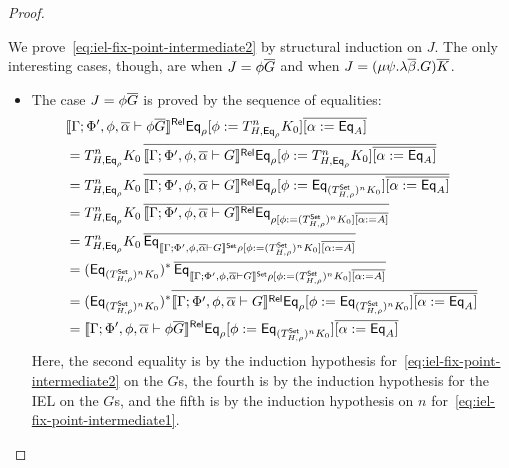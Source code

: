 \documentclass[acmsmall,review,anonymous]{acmart}
\theoremstyle{definition}
\newcommand{\set}{\mathsf{Set}}
\begin{document}
\begin{proof}
\begin{itemize}
We prove~\eqref{eq:iel-fix-point-intermediate2} by structural
induction on $J$. The only interesting cases, though, are when
$J = \phi \overline{G}$ and when $J = (\mu \psi.\lambda \overline{\beta}. G)\overline{K}$.
\begin{itemize}
\item The case $J = \phi \overline{G}$ is proved by the sequence of equalities:
\[
\begin{split}
& \relsem{\Gamma; \Phi', \phi, \ol{\alpha} \vdash \phi
    \ol{G}} \Eq_{\rho} [\phi := T^{n}_{H,\Eq_{\rho}} K_0]
  \overline{[\alpha := \Eq_A]}
  \\
&= T^{n}_{H,\Eq_{\rho}} K_0\, \overline{\relsem{\Gamma; \Phi',
      \phi, \ol{\alpha} \vdash G} \Eq_{\rho} [\phi :=
      T^{n}_{H,\Eq_{\rho}} K_0] \overline{[\alpha :=
        \Eq_A]}} \\ 
&= T^{n}_{H,\Eq_{\rho}} K_0\, \overline{\relsem{\Gamma; \Phi',
      \phi, \ol{\alpha} \vdash G} \Eq_{\rho} [\phi :=
      \Eq_{(T^\set_{H,\rho})^{n} K_0}] \overline{[\alpha :=
        \Eq_A]}} \\ 
&= T^{n}_{H,\Eq_{\rho}} K_0\, \overline{\relsem{\Gamma; \Phi',
      \phi, \ol{\alpha} \vdash G} \Eq_{\rho [\phi := (T^\set_{H,\rho})^{n}
        K_0] \overline{[\alpha := A]}}} \\ 
&= T^{n}_{H,\Eq_{\rho}} K_0\, \overline{\Eq_{\setsem{\Gamma;
        \Phi', \phi, \ol{\alpha} \vdash G} \rho [\phi :=
        (T^\set_{H,\rho})^{n} K_0] \overline{[\alpha :=
          A]}}} \\ 
&= (\Eq_{(T^\set_{H,\rho})^{n} K_0})^* \,\overline{\Eq_{\setsem{\Gamma;
        \Phi', \phi, \ol{\alpha} \vdash G} \rho [\phi :=
        (T^\set_{H,\rho})^{n} K_0] \overline{[\alpha :=
          A]}}} \\ 
&= (\Eq_{(T^\set_{H,\rho})^{n} K_0})^* \overline{\relsem{\Gamma;
      \Phi', \phi, \ol{\alpha} \vdash G} \Eq_{\rho} [\phi :=
      \Eq_{(T^\set_{H,\rho})^{n} K_0}] \overline{[\alpha :=
        \Eq_A]}} \\ 
&= \relsem{\Gamma; \Phi', \phi, \ol{\alpha} \vdash \phi \ol{G}}
  \Eq_{\rho} [\phi := \Eq_{(T^\set_{H,\rho})^{n} K_0}]
  \overline{[\alpha := \Eq_A]} 
\end{split}
\]
Here, the second equality is by the induction hypothesis
for~\eqref{eq:iel-fix-point-intermediate2} on the $G$s, the fourth is
by the induction hypothesis for the IEL on the $G$s, and the fifth is
by the induction hypothesis on $n$
for~\eqref{eq:iel-fix-point-intermediate1}.


\end{itemize}
\end{itemize}
\end{proof}
\end{document}
